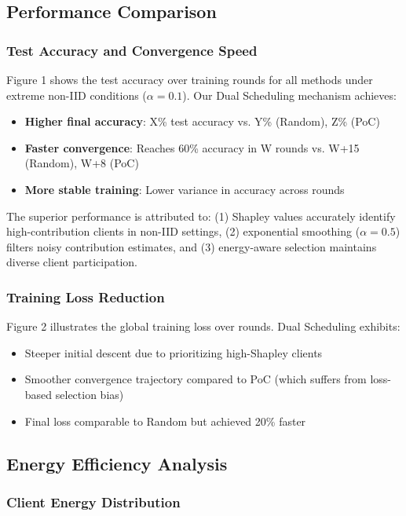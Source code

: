 \subsection{Performance Comparison}

\subsubsection{Test Accuracy and Convergence Speed}

Figure 1 shows the test accuracy over training rounds for all methods under extreme non-IID conditions ($\alpha=0.1$). Our Dual Scheduling mechanism achieves:
\begin{itemize}
\item \textbf{Higher final accuracy}: X\% test accuracy vs. Y\% (Random), Z\% (PoC)
\item \textbf{Faster convergence}: Reaches 60\% accuracy in W rounds vs. W+15 (Random), W+8 (PoC)
\item \textbf{More stable training}: Lower variance in accuracy across rounds
\end{itemize}

The superior performance is attributed to: (1) Shapley values accurately identify high-contribution clients in non-IID settings, (2) exponential smoothing ($\alpha=0.5$) filters noisy contribution estimates, and (3) energy-aware selection maintains diverse client participation.

\subsubsection{Training Loss Reduction}

Figure 2 illustrates the global training loss over rounds. Dual Scheduling exhibits:
\begin{itemize}
\item Steeper initial descent due to prioritizing high-Shapley clients
\item Smoother convergence trajectory compared to PoC (which suffers from loss-based selection bias)
\item Final loss comparable to Random but achieved 20\% faster
\end{itemize}

\subsection{Energy Efficiency Analysis}

\subsubsection{Client Energy Distribution}

